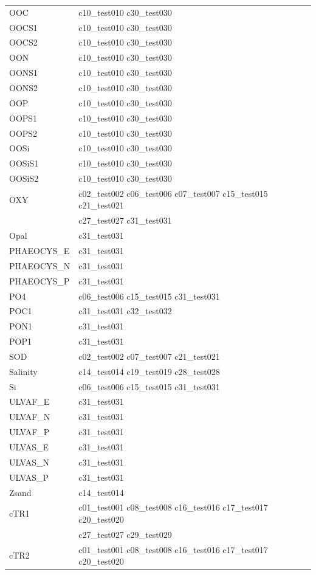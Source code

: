 \begin{longtable}{ll}
OOC & c10\_test010 c30\_test030 \\
OOCS1 & c10\_test010 c30\_test030 \\
OOCS2 & c10\_test010 c30\_test030 \\
OON & c10\_test010 c30\_test030 \\
OONS1 & c10\_test010 c30\_test030 \\
OONS2 & c10\_test010 c30\_test030 \\
OOP & c10\_test010 c30\_test030 \\
OOPS1 & c10\_test010 c30\_test030 \\
OOPS2 & c10\_test010 c30\_test030 \\
OOSi & c10\_test010 c30\_test030 \\
OOSiS1 & c10\_test010 c30\_test030 \\
OOSiS2 & c10\_test010 c30\_test030 \\
OXY & c02\_test002 c06\_test006 c07\_test007 c15\_test015 c21\_test021 \\ 
 & c27\_test027 c31\_test031 \\
Opal & c31\_test031 \\
PHAEOCYS\_E & c31\_test031 \\
PHAEOCYS\_N & c31\_test031 \\
PHAEOCYS\_P & c31\_test031 \\
PO4 & c06\_test006 c15\_test015 c31\_test031 \\
POC1 & c31\_test031 c32\_test032 \\
PON1 & c31\_test031 \\
POP1 & c31\_test031 \\
SOD & c02\_test002 c07\_test007 c21\_test021 \\
Salinity & c14\_test014 c19\_test019 c28\_test028 \\
Si & c06\_test006 c15\_test015 c31\_test031 \\
ULVAF\_E & c31\_test031 \\
ULVAF\_N & c31\_test031 \\
ULVAF\_P & c31\_test031 \\
ULVAS\_E & c31\_test031 \\
ULVAS\_N & c31\_test031 \\
ULVAS\_P & c31\_test031 \\
Zsand & c14\_test014 \\
cTR1 & c01\_test001 c08\_test008 c16\_test016 c17\_test017 c20\_test020 \\ 
 & c27\_test027 c29\_test029 \\
cTR2 & c01\_test001 c08\_test008 c16\_test016 c17\_test017 c20\_test020 \\ 

\end{longtable}
